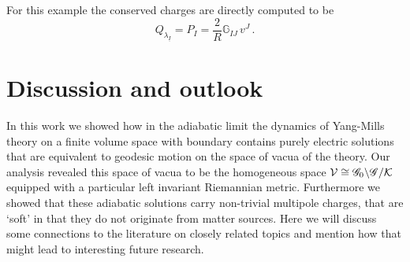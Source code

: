 \documentclass[11pt,a4paper]{article}
\def\calg{{\mathscr G}}
\def\calk{{\cal K}}
\def\calv{{\cal V}}
\def\uI{{\underline{I}}}
\begin{document}
    For this example the conserved charges are directly computed to be
    \begin{equation}
    Q_{\lambda_{\uI}}=P_I=\frac{2}{R}\mathbb{G}_{IJ}\,v^J\,.
    \end{equation}
    
    
    \section{Discussion and outlook}\label{discsec}
    In this work we showed how in the adiabatic limit the dynamics of Yang-Mills theory on a finite volume space with boundary contains purely electric solutions that are equivalent to geodesic motion on the space of vacua of the theory. Our analysis revealed this space of vacua to be the homogeneous space $\calv\cong \calg_0\backslash\calg/\calk$ equipped with a particular left invariant Riemannian metric. Furthermore we showed that these adiabatic solutions carry non-trivial multipole charges, that are `soft' in that they do not originate from matter sources. Here we will discuss some connections to the literature on closely related topics and mention how that might lead to interesting future research.
    
\end{document}
